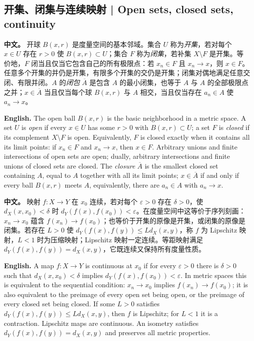 \documentclass[UTF8,11pt,a4paper]{ctexart}
\newcommand{\APS}[2]{\par\noindent\textbf{中文。} #1\par\noindent\textbf{English.} #2\par\smallskip}
\begin{document}
\subsection{开集、闭集与连续映射 | Open sets, closed sets, continuity}
\APS{开球 $B(x,r)$ 是度量空间的基本邻域。集合 $U$ 称为\emph{开集}，若对每个 $x\in U$ 存在 $r>0$ 使 $B(x,r)\subset U$；集合 $F$ 称为\emph{闭集}，若补集 $X\setminus F$ 是开集。等价地，$F$ 闭当且仅当它包含自己的所有极限点：若 $x_n\in F$ 且 $x_n\to x$，则 $x\in F$。任意多个开集的并仍是开集，有限多个开集的交仍是开集；闭集对偶地满足任意交闭、有限并闭。$A$ 的\emph{闭包} $\overline A$ 是包含 $A$ 的最小闭集，也等于 $A$ 与 $A$ 的全部极限点之并；$x\in\overline A$ 当且仅当每个球 $B(x,r)$ 与 $A$ 相交，当且仅当存在 $a_n\in A$ 使 $a_n\to x$。}{The open ball $B(x,r)$ is the basic neighborhood in a metric space. A set $U$ is \emph{open} if every $x\in U$ has some $r>0$ with $B(x,r)\subset U$; a set $F$ is \emph{closed} if its complement $X\setminus F$ is open. Equivalently, $F$ is closed exactly when it contains all its limit points: if $x_n\in F$ and $x_n\to x$, then $x\in F$. Arbitrary unions and finite intersections of open sets are open; dually, arbitrary intersections and finite unions of closed sets are closed. The \emph{closure} $\overline A$ is the smallest closed set containing $A$, equal to $A$ together with all its limit points; $x\in\overline A$ if and only if every ball $B(x,r)$ meets $A$, equivalently, there are $a_n\in A$ with $a_n\to x$.}

\APS{映射 $f:X\to Y$ 在 $x_0$ 连续，若对每个 $\varepsilon>0$ 存在 $\delta>0$，使 $d_X(x,x_0)<\delta$ 时 $d_Y(f(x),f(x_0))<\varepsilon$。在度量空间中这等价于序列刻画：$x_n\to x_0$ 蕴含 $f(x_n)\to f(x_0)$；也等价于开集的原像是开集，或闭集的原像是闭集。若存在 $L>0$ 使 $d_Y(f(x),f(y))\le Ld_X(x,y)$，称 $f$ 为 Lipschitz 映射，$L<1$ 时为压缩映射；Lipschitz 映射一定连续。等距映射满足 $d_Y(f(x),f(y))=d_X(x,y)$，它既连续又保持所有度量性质。}{A map $f:X\to Y$ is continuous at $x_0$ if for every $\varepsilon>0$ there is $\delta>0$ such that $d_X(x,x_0)<\delta$ implies $d_Y(f(x),f(x_0))<\varepsilon$. In metric spaces this is equivalent to the sequential condition: $x_n\to x_0$ implies $f(x_n)\to f(x_0)$; it is also equivalent to the preimage of every open set being open, or the preimage of every closed set being closed. If some $L>0$ satisfies $d_Y(f(x),f(y))\le Ld_X(x,y)$, then $f$ is Lipschitz; for $L<1$ it is a contraction. Lipschitz maps are continuous. An isometry satisfies $d_Y(f(x),f(y))=d_X(x,y)$ and preserves all metric properties.}
\end{document}
